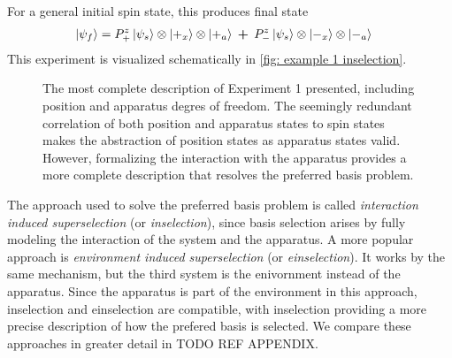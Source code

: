 For a general initial spin state, this produces final state
\begin{align}
  \ket{\psi_f} &= P^z_+ \ket{\psi_s} \otimes \ket{+_x} \otimes \ket{+_a} \: \bm{+} \: P^z_- \ket{\psi_s} \otimes \ket{-_x} \otimes \ket{-_a}
\end{align} This experiment is visualized schematically in \autoref{fig: example 1 inselection}.

\begin{figure}
\centering\CaptionFontSize
{}
\caption[Insert an abbreviated caption here to show in the List of Figures]
{The most complete description of Experiment 1 presented, including position and apparatus degres of freedom. The seemingly redundant correlation of both position and apparatus states to spin states makes the abstraction of position states as apparatus states valid. However, formalizing the interaction with the apparatus provides a more complete description that resolves the preferred basis problem.}
\label{fig: example 1 inselection}
\end{figure}

The approach used to solve the preferred basis problem is called \textit{interaction induced superselection} (or \textit{inselection}), since basis selection arises by fully modeling the interaction of the system and the apparatus. A more popular approach is \textit{environment induced superselection} (or \textit{einselection}). It works by the same mechanism, but the third system is the enivornment instead of the apparatus. Since the apparatus is part of the environment in this approach, inselection and einselection are compatible, with inselection providing a more precise description of how the prefered basis is selected. We compare these approaches in greater detail in TODO REF APPENDIX.

